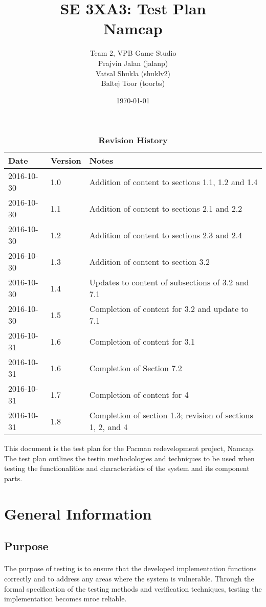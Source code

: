 \documentclass[12pt, titlepage]{article}
\title{SE 3XA3: Test Plan\\Namcap}
\author{Team 2, VPB Game Studio
		\\ Prajvin Jalan (jalanp)
		\\ Vatsal Shukla (shuklv2)
		\\ Baltej Toor (toorbs)
}
\date{\today}
\begin{document}
\maketitle

\tableofcontents
\listoftables
\listoffigures

\begin{table}[h]
\caption{\bf Revision History}
\begin{tabularx}{\textwidth}{p{3cm}p{2cm}X}
\toprule {\bf Date} & {\bf Version} & {\bf Notes}\\
\midrule
2016-10-30 & 1.0 & Addition of content to sections 1.1, 1.2 and 1.4\\
2016-10-30 & 1.1 & Addition of content to sections 2.1 and 2.2\\
2016-10-30 & 1.2 & Addition of content to sections 2.3 and 2.4\\
2016-10-30 & 1.3 & Addition of content to section 3.2\\
2016-10-30 & 1.4 & Updates to content of subsections of 3.2 and 7.1\\
2016-10-30 & 1.5 & Completion of content for 3.2 and update to 7.1\\
2016-10-31 & 1.6 & Completion of content for 3.1\\
2016-10-31 & 1.6 & Completion of Section 7.2\\
2016-10-31 & 1.7 & Completion of content for 4\\
2016-10-31 & 1.8 & Completion of section 1.3; revision of sections 1, 2, and 4\\
\bottomrule
\end{tabularx}
\end{table}

\newpage


This document is the test plan for the Pacman redevelopment project, Namcap. The test plan outlines the testin methodologies and techniques to be used when testing the functionalities and characteristics of the system and its component parts.

\section{General Information}

\subsection{Purpose}
\paragraph{}
The purpose of testing is to ensure that the developed implementation functions correctly and to address any areas where the system is vulnerable. Through the formal specification of the testing methods and verification techniques, testing the implementation becomes mroe reliable.
\end{document}
